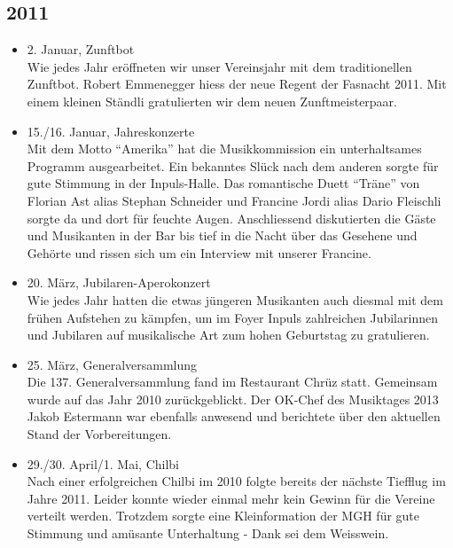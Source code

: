 \subsection*{2011}
\begin{history}


    \begin{itemize}

        \item 2. Januar, Zunftbot\\
              Wie jedes Jahr eröffneten wir unser Vereinsjahr mit dem traditionellen
              Zunftbot. Robert Emmenegger hiess der neue Regent der Fasnacht 2011. Mit
              einem kleinen Ständli gratulierten wir dem neuen Zunftmeisterpaar.

        \item 15./16. Januar, Jahreskonzerte\\
              Mit dem Motto \enquote{Amerika} hat die Musikkommission ein unterhaltsames
              Programm ausgearbeitet. Ein bekanntes Slück nach dem anderen sorgte für
              gute Stimmung in der Inpuls-Halle. Das romantische Duett \enquote{Träne} von
              Florian Ast alias Stephan Schneider und Francine Jordi alias Dario
              Fleischli sorgte da und dort für feuchte Augen. Anschliessend
              diskutierten die Gäste und Musikanten in der Bar bis tief in die Nacht
              über das Gesehene und Gehörte und rissen sich um ein Interview mit
              unserer Francine.

        \item 20. März, Jubilaren-Aperokonzert\\
              Wie jedes Jahr hatten die etwas jüngeren Musikanten auch diesmal mit dem
              frühen Aufstehen zu kämpfen, um im Foyer Inpuls zahlreichen Jubilarinnen
              und Jubilaren auf musikalische Art zum hohen Geburtstag zu gratulieren.

        \item 25. März, Generalversammlung\\
              Die 137. Generalversammlung fand im Restaurant Chrüz statt. Gemeinsam
              wurde auf das Jahr 2010 zurückgeblickt. Der OK-Chef des Musiktages 2013
              Jakob Estermann war ebenfalls anwesend und berichtete über den aktuellen
              Stand der Vorbereitungen.

        \item 29./30. April/1. Mai, Chilbi\\
              Nach einer erfolgreichen Chilbi im 2010 folgte bereits der nächste
              Tiefflug im Jahre 2011. Leider konnte wieder einmal mehr kein Gewinn für
              die Vereine verteilt werden. Trotzdem sorgte eine Kleinformation der MGH
              für gute Stimmung und amüsante Unterhaltung - Dank sei dem Weisswein.


\end{itemize}
\end{history}
